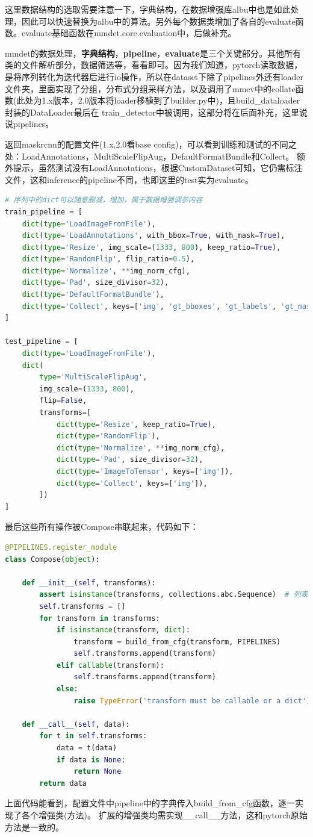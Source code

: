 \documentclass[UTF8]{ctexart}
\begin{document}
这里数据结构的选取需要注意一下，字典结构，在数据增强库albu中也是如此处理，因此可以快速替换为albu中的算法。另外每个数据类增加了各自的evaluate函数。evaluate基础函数在mmdet.core.evaluation中，后做补充。

mmdet的数据处理，\textbf{字典结构}，\textbf{pipeline}，\textbf{evaluate}是三个关键部分。其他所有类的文件解析部分，数据筛选等，看看即可。因为我们知道，pytorch读取数据，是将序列转化为迭代器后进行io操作，所以在dataset下除了pipelines外还有loader文件夹，里面实现了分组，分布式分组采样方法，以及调用了mmcv中的collate函数(此处为1.x版本，2.0版本将loader移植到了builder.py中)，且build\_dataloader封装的DataLoader最后在
train\_detector中被调用，这部分将在后面补充，这里说说pipelines。

返回maskrcnn的配置文件(1.x,2.0看base config)，可以看到训练和测试的不同之处：LoadAnnotations，MultiScaleFlipAug，DefaultFormatBundle和Collect。
额外提示，虽然测试没有LoadAnnotations，根据CustomDataset可知，它仍需标注文件，这和inference的pipeline不同，也即这里的test实为evaluate。

\lstset{style=mystyle}
\begin{lstlisting}[language=Python]
# 序列中的dict可以随意删减，增加，属于数据增强调参内容
train_pipeline = [
    dict(type='LoadImageFromFile'),
    dict(type='LoadAnnotations', with_bbox=True, with_mask=True),
    dict(type='Resize', img_scale=(1333, 800), keep_ratio=True),
    dict(type='RandomFlip', flip_ratio=0.5),
    dict(type='Normalize', **img_norm_cfg),
    dict(type='Pad', size_divisor=32),
    dict(type='DefaultFormatBundle'),
    dict(type='Collect', keys=['img', 'gt_bboxes', 'gt_labels', 'gt_masks']),
]

test_pipeline = [
    dict(type='LoadImageFromFile'),
    dict(
        type='MultiScaleFlipAug',
        img_scale=(1333, 800),
        flip=False,
        transforms=[
            dict(type='Resize', keep_ratio=True),
            dict(type='RandomFlip'),
            dict(type='Normalize', **img_norm_cfg),
            dict(type='Pad', size_divisor=32),
            dict(type='ImageToTensor', keys=['img']),
            dict(type='Collect', keys=['img']),
        ])
]
\end{lstlisting}
最后这些所有操作被Compose串联起来，代码如下：

\lstset{style=mystyle}
\begin{lstlisting}[language=Python]
@PIPELINES.register_module
class Compose(object):

	def __init__(self, transforms):
		assert isinstance(transforms, collections.abc.Sequence)  # 列表是序列结构
		self.transforms = []
		for transform in transforms:
			if isinstance(transform, dict):
				transform = build_from_cfg(transform, PIPELINES)
				self.transforms.append(transform)
			elif callable(transform):
				self.transforms.append(transform)
			else:
				raise TypeError('transform must be callable or a dict')

	def __call__(self, data):
		for t in self.transforms:
			data = t(data)
			if data is None:
				return None
		return data
\end{lstlisting}
上面代码能看到，配置文件中pipeline中的字典传入build\_from\_cfg函数，逐一实现了各个增强类(方法)。
扩展的增强类均需实现\_\_call\_\_方法，这和pytorch原始方法是一致的。
\end{document}
